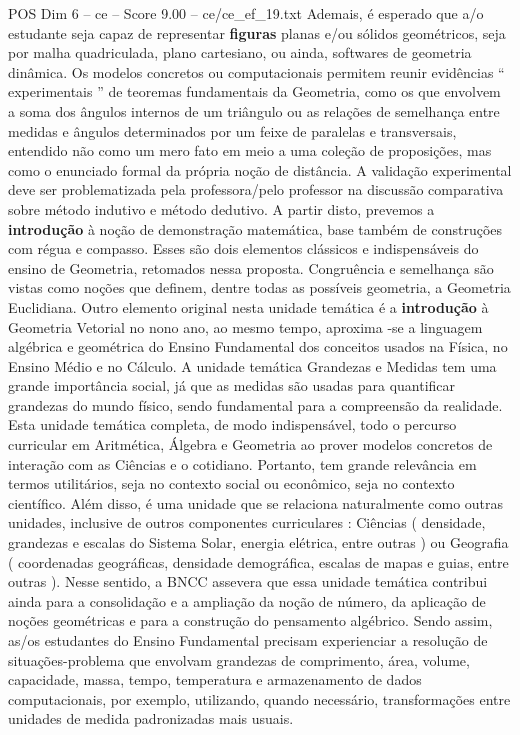 \begin{textsample}{POS Dim 6 – ce – Score 9.00 – ce/ce\_ef\_19.txt}
Ademais, é esperado que a/o estudante seja capaz de representar \textbf{figuras} planas e/ou sólidos geométricos, seja por malha quadriculada, plano cartesiano, ou ainda, softwares de geometria dinâmica.
Os modelos concretos ou computacionais permitem reunir evidências “ experimentais ” de teoremas fundamentais da Geometria, como os que envolvem a soma dos ângulos internos de um triângulo ou as relações de semelhança entre medidas e ângulos determinados por um feixe de paralelas e transversais, entendido não como um mero fato em meio a uma coleção de proposições, mas como o enunciado formal da própria noção de distância.
A validação experimental deve ser problematizada pela professora/pelo professor na discussão comparativa sobre método indutivo e método dedutivo.
A partir disto, prevemos a \textbf{introdução} à noção de demonstração matemática, base também de construções com régua e compasso.
Esses são dois elementos clássicos e indispensáveis do ensino de Geometria, retomados nessa proposta.
Congruência e semelhança são vistas como noções que definem, dentre todas as possíveis geometria, a Geometria Euclidiana.
Outro elemento original nesta unidade temática é a \textbf{introdução} à Geometria Vetorial no nono ano, ao mesmo tempo, aproxima -se a linguagem algébrica e geométrica do Ensino Fundamental dos conceitos usados na Física, no Ensino Médio e no Cálculo.
A unidade temática Grandezas e Medidas tem uma grande importância social, já que as medidas são usadas para quantificar grandezas do mundo físico, sendo fundamental para a compreensão da realidade.
Esta unidade temática completa, de modo indispensável, todo o percurso curricular em Aritmética, Álgebra e Geometria ao prover modelos concretos de interação com as Ciências e o cotidiano.
Portanto, tem grande relevância em termos utilitários, seja no contexto social ou econômico, seja no contexto científico.
Além disso, é uma unidade que se relaciona naturalmente como outras unidades, inclusive de outros componentes curriculares : Ciências ( densidade, grandezas e escalas do Sistema Solar, energia elétrica, entre outras ) ou Geografia ( coordenadas geográficas, densidade demográfica, escalas de mapas e guias, entre outras ).
Nesse sentido, a BNCC assevera que essa unidade temática contribui ainda para a consolidação e a ampliação da noção de número, da aplicação de noções geométricas e para a construção do pensamento algébrico.
Sendo assim, as/os estudantes do Ensino Fundamental precisam experienciar a resolução de situações-problema que envolvam grandezas de comprimento, área, volume, capacidade, massa, tempo, temperatura e armazenamento de dados computacionais, por exemplo, utilizando, quando necessário, transformações entre unidades de medida padronizadas mais usuais.

\end{textsample}
